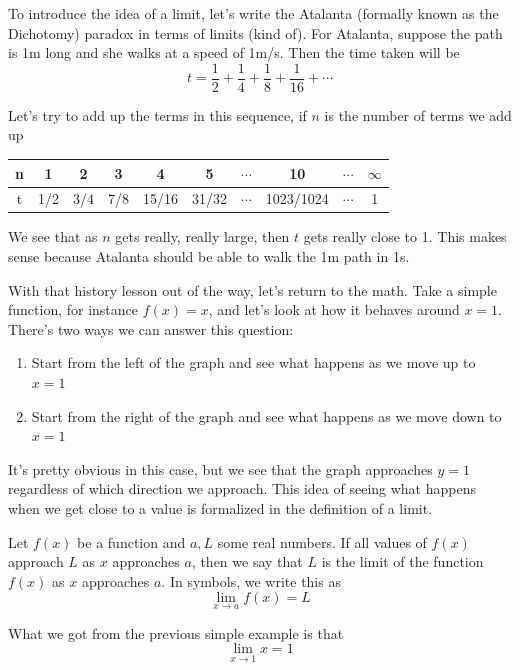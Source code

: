 To introduce the idea of a limit, let's write the Atalanta (formally known as the Dichotomy) paradox in terms of limits (kind of). For Atalanta, suppose the path is 1m long and she walks at a speed of 1m/s. Then the time taken will be
\[ t = \frac{1}{2} + \frac{1}{4} + \frac{1}{8} + \frac{1}{16} + \cdots \]

Let's try to add up the terms in this sequence, if $n$ is the number of terms we add up
\begin{center}
\begin{tabular}{|c|c|c|c|c|c|c|c|c|c|}
\hline 
n & 1 & 2 & 3 & 4 & 5 & $\cdots$ & 10 & $\cdots$ & $\infty$ \\ 
\hline 
t & 1/2 & 3/4 & 7/8 & 15/16 & 31/32 & $\cdots$ & 1023/1024 & $\cdots$ & 1 \\ 
\hline 
\end{tabular} 
\end{center}

We see that as $n$ gets really, really large, then $t$ gets really close to 1. This makes sense because Atalanta should be able to walk the 1m path in 1s.

With that history lesson out of the way, let's return to the math. Take a simple function, for instance $f(x) = x$, and let's look at how it behaves around $x = 1$. There's two ways we can answer this question:
\begin{enumerate}
	\item Start from the left of the graph and see what happens as we move up to $x = 1$
	\item Start from the right of the graph and see what happens as we move down to $x = 1$
\end{enumerate}

It's pretty obvious in this case, but we see that the graph approaches $y = 1$ regardless of which direction we approach. This idea of seeing what happens when we get close to a value is formalized in the definition of a limit.

\begin{definition}
Let $f(x)$ be a function and $a, L$ some real numbers. If all values of $f(x)$ approach $L$ as $x$ approaches $a$, then we say that $L$ is the limit of the function $f(x)$ as $x$ approaches $a$. In symbols, we write this as
\[ \lim_{x \to a} f(x) = L \]
\end{definition}

\begin{example}
What we got from the previous simple example is that
\[ \lim_{x \to 1} x = 1 \]
\end{example}

